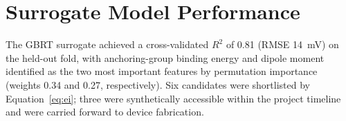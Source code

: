 \section{Surrogate Model Performance}

The GBRT surrogate achieved a cross-validated $R^2$ of 0.81 (RMSE
14~mV) on the held-out fold, with anchoring-group binding energy and
dipole moment identified as the two most important features by
permutation importance (weights 0.34 and 0.27, respectively). Six
candidates were shortlisted by Equation~\eqref{eq:ei}; three were
synthetically accessible within the project timeline and were carried
forward to device fabrication.
